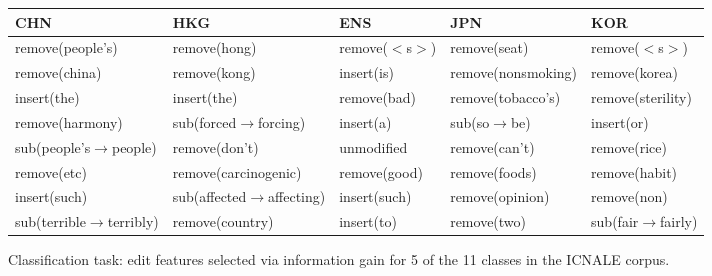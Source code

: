 \begin{figure*}[t]
\begin{center}
    \begin{tabular}{lllll}
        \hline
        \textbf{CHN} & \textbf{HKG} & \textbf{ENS} & \textbf{JPN} & \textbf{KOR} \\
        \hline
        remove(people's) & remove(hong) & remove($<$s$>$) & remove(seat) &
        remove($<$s$>$) \\
        remove(china)    & remove(kong) & insert(is) & remove(nonsmoking) & remove(korea) \\
        insert(the)  & insert(the)  & remove(bad) & remove(tobacco's) & remove(sterility) \\
        remove(harmony)  & sub(forced$\rightarrow$forcing) &
        insert(a) & sub(so$\rightarrow$be) & insert(or) \\
        sub(people's$\rightarrow$people) & remove(don't) & unmodified & remove(can't) & remove(rice) \\
        remove(etc)      & remove(carcinogenic) & remove(good) & remove(foods) & remove(habit) \\
        insert(such) & sub(affected$\rightarrow$affecting) & insert(such)
        & remove(opinion) & remove(non) \\
        sub(terrible$\rightarrow$terribly) & remove(country) & insert(to)
        & remove(two) & sub(fair$\rightarrow$fairly) \\
        \hline
    \end{tabular}
    \caption{Classification task: edit features selected via information gain
    for 5 of the 11 classes in the ICNALE corpus.}
    \label{fig-class-features}
\end{center}
\vskip-20pt
\end{figure*}
